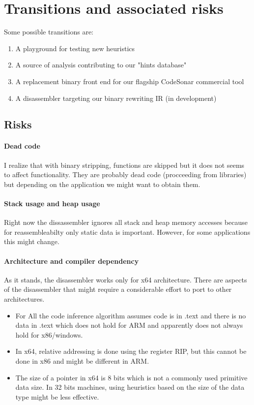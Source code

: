 \documentclass[]{llncs}
\begin{document}
\section{Transitions and associated risks}
\label{sec:risks}
Some possible transitions are:
\begin{enumerate}
\item  A playground for testing new heuristics
\item  A source of analysis contributing to our "hints database"
\item  A replacement binary front end for our flagship CodeSonar commercial tool
\item  A disassembler targeting our binary rewriting IR (in development)
\end{enumerate}

\subsection{Risks}

\paragraph{Dead code}
I realize that with binary stripping, functions are skipped but it does not seems to
affect functionality. They are probably dead code (procceeding from libraries)
but depending on the application we might want to obtain them.

\paragraph{Stack usage and heap usage}
Right now the dissassembler ignores all stack and heap memory accesses because for
reassembleabilty only static data is important.
However, for some applications this might change.

\paragraph{Architecture and compiler dependency}
As it stands, the disassembler works only for x64 architecture. There
are aspects of the disassembler that might require a considerable
effort to port to other architectures.

\begin{itemize}
\item For All the code inference algorithm assumes code
  is in .text and there is no data in .text which does not hold for ARM and apparently
  does not always hold for x86/windows.

\item 
  In x64, relative addressing is done using the register RIP, but this
  cannot be done in x86 and might be different in ARM.

\item
  The size of a pointer in x64 is 8 bits which is not a commonly used
  primitive data size. In 32 bits machines, using heuristics based on the
  size of the data type might be less effective.

\end{itemize}
\end{document}
